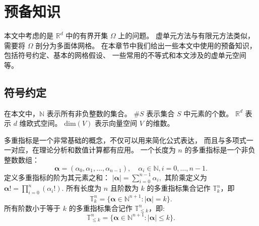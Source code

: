 \chapter{预备知识}
本文中考虑的是 $\mathbb R^d$ 中的有界开集 $\Omega$
上的问题。
虚单元方法与有限元方法类似，需要将 $\Omega$ 剖分为多面体网格。
在本章节中我们给出一些本文中使用的预备知识，包括符号约定、基本的网格假设、
一些常用的不等式和本文涉及的虚单元空间等。

\section{符号约定}
在本文中，$\mathbb{N}$ 表示所有非负整数的集合。
$\#S$ 表示集合 $S$ 中元素的个数。 $\mathbb{R}^d$ 表示 $d$ 维欧式空间。
$\mathrm{dim}(V)$ 表示向量空间 $V$ 的维数。

多重指标是一个非常基础的概念，不仅可以用来简化公式表达，
而且与多项式一一对应，在理论分析和数值计算都有应用。
一个长度为 $n$ 的多重指标是一个非负整数数组：
$$
\boldsymbol\alpha = (\alpha_0, \alpha_1, \ldots, \alpha_{n-1}), \quad \alpha_i
\in \mathbb{N}, i=0, \ldots, n-1.
$$
定义多重指标的阶为其元素之和：
$
|\boldsymbol \alpha| = \sum_{i = 0}^{n-1} \alpha_i,
$
其阶乘定义为
$
\boldsymbol \alpha! = \prod_{i=0}^n (\alpha_i!).
$
所有长度为 $n$ 且阶数为 $k$ 的多重指标集合记作 $\mathbb{T}^n_k$，即
$$
\mathbb{T}^n_k = \{ \boldsymbol \alpha \in \mathbb{N}^{n+1}: |\boldsymbol \alpha| = k\}.
$$
所有阶数小于等于 $k$ 的多重指标集合记作 $\mathbb{T}^n_{\leq k}$，即:
$$
\mathbb{T}^n_{\leq k} = \{ \boldsymbol \alpha \in \mathbb{N}^{n+1}: |\boldsymbol
\alpha| \leq k\}.
$$

